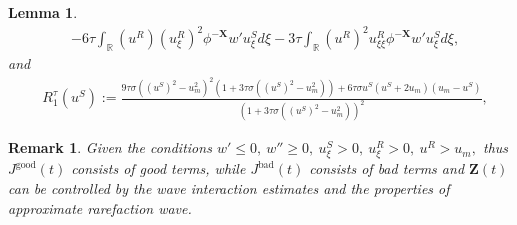 \documentclass[10pt,reqno]{amsart}
\numberwithin{equation}{section}
\newtheorem{lemma}[theorem]{Lemma}
\newtheorem{remark}{Remark}[section]
\begin{document}
\begin{lemma}
\begin{equation}
\begin{aligned}
				&- 6\tau\int_{\mathbb{R}}(u^{R})(u_{\xi}^{R})^{2}\phi^{-\mathbf{X}}w'u_{\xi}^{S}d\xi-3\tau\int_{\mathbb{R}}(u^{R})^{2}u_{\xi\xi}^{R}\phi^{-\mathbf{X}}w'u_{\xi}^{S}d\xi,
			\end{aligned}
		\end{equation}
		and
		\begin{equation}
			\begin{aligned}
				&R_{1}^{\tau}(u^{S})
				:=\frac{9\tau\sigma\left((u^{S})^{2}-u_{m}^{2}\right)^{2}\left(1+3\tau\sigma\left((u^{S})^{2}-u_{m}^{2}\right)\right)+6\tau\sigma u^{S}(u^{S}+2u_{m})(u_{m}-u^{S})}{\left(1+3\tau\sigma\left((u^{S})^{2}-u_{m}^{2}\right)\right)^{2}},
			\end{aligned}
		\end{equation}
	\end{lemma}
	\begin{remark}
		Given the conditions $w'\leq0,\ w''\geq0,\ u_{\xi}^{S}>0,\ u_{\xi}^{R}>0,\ u^{R}>u_{m},$ thus $J^{\text{good}}(t)$ consists of good terms, while $J^{\text{bad}}(t)$ consists of bad terms and $\mathbf{Z}(t)$ can be controlled by the wave interaction estimates and the properties of approximate rarefaction wave.
	\end{remark}
\end{document}
